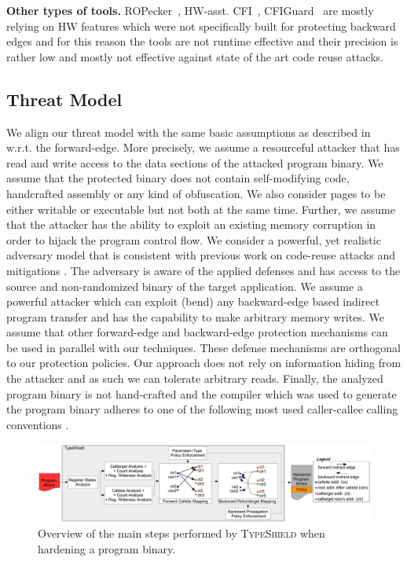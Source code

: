 \textbf{Other types of tools.} ROPecker~\cite{ropecker}, HW-asst. CFI~\cite{davi:hardware}, 
CFIGuard~\cite{cfiguard:yuan} are mostly relying on HW features which were not specifically built for protecting backward edges and 
for this reason the tools are not runtime effective and their precision is rather low and mostly not effective against state of the art code
reuse attacks.

\subsection{Threat Model}
\label{Adversary Model}

We align our threat model with the same basic assumptions as described in~\cite{veen:typearmor} w.r.t. the forward-edge.
More precisely, we assume a resourceful attacker that has read and write access to the data 
sections of the attacked program binary. We assume that the protected binary does not contain 
self-modifying code, handcrafted assembly or any kind of obfuscation. We also consider pages 
to be either writable or executable but not both at the same time. Further, we assume 
that the attacker has the ability to exploit an existing memory corruption in order to hijack the program
control flow. 
We consider a powerful, yet realistic adversary
model that is consistent with previous work on code-reuse
attacks and mitigations \cite{volodymyr:cpi}. 
The adversary is aware of the
applied defenses and has access to the source and non-randomized 
binary of the target application.
We assume a powerful attacker which can exploit (bend)
any backward-edge based indirect program transfer and
has the capability to make arbitrary memory writes. 
We assume that other forward-edge and backward-edge protection mechanisms
can be used in parallel with our techniques.
These defense
mechanisms are orthogonal to our protection policies. Our
approach does not rely on information hiding from the
attacker and as such we can tolerate arbitrary reads. 
Finally, the analyzed program binary is not hand-crafted and the compiler which was used
to generate the program binary adheres to one of the 
following most used caller-callee calling conventions \cite{arm:abi, microsoft:abi, itanium:abi}.

\begin{center}
\begin{figure}[t!]
\centering
   \includegraphics[width=.88\textwidth]{figures/overview.pdf}
    \caption{Overview of the main steps performed by \textsc{TypeShield} when hardening a program binary.}
    \label{System overview.}
    \vspace{-.5cm}
 \end{figure}
\end{center}
